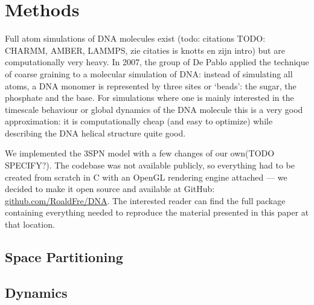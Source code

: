 \section{Methods}

Full atom simulations of DNA molecules exist (todo: citations TODO: CHARMM, AMBER, LAMMPS, zie citaties is knotts en zijn intro) but are computationally very heavy. In 2007, the group of De Pablo \cite{knotts2007coarse} applied the technique of coarse graining to a molecular simulation of DNA: instead of simulating all atoms, a DNA monomer is represented by three sites or `beads': the sugar, the phosphate and the base. For simulations where one is mainly interested in the timescale behaviour or global dynamics of the DNA molecule this is a very good approximation: it is computationally cheap (and easy to optimize) while describing the DNA helical structure quite good. 

We implemented the 3SPN model with a few changes of our own(TODO SPECIFY?). The codebase was not available publicly, so everything had to be created from scratch in C with an OpenGL rendering engine attached --- we decided to make it open source and available at GitHub: \href{https://github.com/RoaldFre/DNA}{github.com/RoaldFre/DNA}. The interested reader can find the full package containing everything needed to reproduce the material presented in this paper at that location.









\subsection{Space Partitioning}




\subsection{Dynamics}
